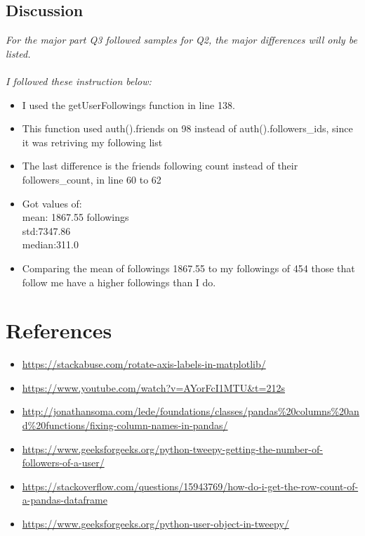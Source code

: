 \documentclass[12pt]{article}
\begin{document}
\subsection*{Discussion}
\emph{ For the major part Q3 followed samples for Q2, the major differences will only be listed.\\ \\}
\emph{I followed these instruction below:}
    \begin{itemize}
        \item I used the getUserFollowings function in line 138.
         
        \item This function used auth().friends on 98 instead of auth().followers\_ids, since it was retriving my following list
        
        \item The last difference is the friends following count instead of their followers\_count, in line 60 to 62
        
        \item Got values of: \\
                mean: 1867.55 followings\\
                std:7347.86\\
                median:311.0\\
        \item Comparing the mean of followings 1867.55 to my followings of 454  those that follow me have a higher followings than I do. 
    \end{itemize}
\section*{References}
\begin{itemize}
    \item {\url{https://stackabuse.com/rotate-axis-labels-in-matplotlib/}}
    \item {\url{https://www.youtube.com/watch?v=AYorFcI1MTU&t=212s}}

    
     \item {\url{http://jonathansoma.com/lede/foundations/classes/pandas\%20columns\%20and\%20functions/fixing-column-names-in-pandas/}}
     \item {\url{https://www.geeksforgeeks.org/python-tweepy-getting-the-number-of-followers-of-a-user/}}
     \item {\url{https://stackoverflow.com/questions/15943769/how-do-i-get-the-row-count-of-a-pandas-dataframe}}
     \item {\url{https://www.geeksforgeeks.org/python-user-object-in-tweepy/}}

\end{itemize}
\end{document}
